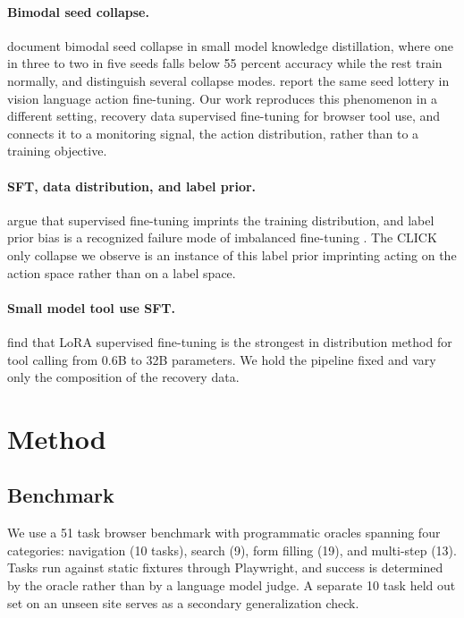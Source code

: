 \documentclass[11pt]{article}
\begin{document}
\paragraph{Bimodal seed collapse.}
\citet{noisefloor2026} document bimodal seed collapse in small model knowledge
distillation, where one in three to two in five seeds falls below 55 percent
accuracy while the rest train normally, and distinguish several collapse modes.
\citet{vla2026} report the same seed lottery in vision language action
fine-tuning. Our work reproduces this phenomenon in a different setting,
recovery data supervised fine-tuning for browser tool use, and connects it to a
monitoring signal, the action distribution, rather than to a training
objective.

\paragraph{SFT, data distribution, and label prior.}
\citet{sftmemorizes2025} argue that supervised fine-tuning imprints the training
distribution, and label prior bias is a recognized failure mode of imbalanced
fine-tuning \citep{labelbias2024}. The CLICK only collapse we observe is an
instance of this label prior imprinting acting on the action space rather than
on a label space.

\paragraph{Small model tool use SFT.}
\citet{sftorrl2026} find that LoRA supervised fine-tuning is the strongest in
distribution method for tool calling from 0.6B to 32B parameters. We hold the
pipeline fixed and vary only the composition of the recovery data.

\section{Method}

\subsection{Benchmark}
We use a 51 task browser benchmark with programmatic oracles spanning four
categories: navigation (10 tasks), search (9), form filling (19), and
multi-step (13). Tasks run against static fixtures through Playwright, and
success is determined by the oracle rather than by a language model judge. A
separate 10 task held out set on an unseen site serves as a secondary
generalization check.
\end{document}
